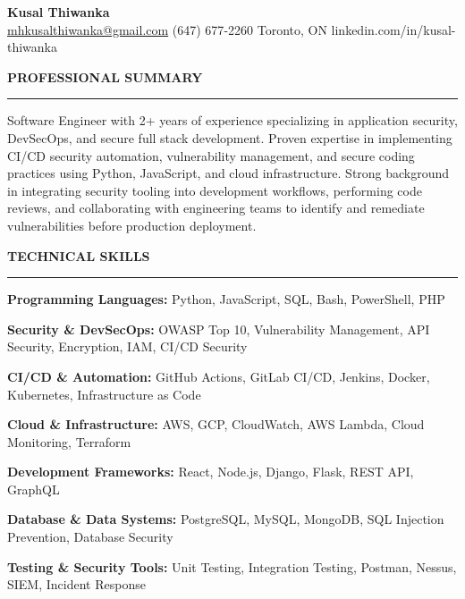 \documentclass[10pt,letterpaper]{article}
\begin{document}
\begin{center}
{\LARGE\textbf{Kusal Thiwanka}}\\[3pt]
\href{mailto:mhkusalthiwanka@gmail.com}{mhkusalthiwanka@gmail.com}\hspace{2em}%
(647) 677{-}2260\hspace{2em}%
Toronto, ON\hspace{2em}
linkedin.com/in/kusal-thiwanka
\end{center}

\vspace{6pt}

\textbf{PROFESSIONAL SUMMARY}\\[-8pt]
\noindent\rule{\textwidth}{1pt}

\vspace{-2pt}

Software Engineer with 2+ years of experience specializing in application security, DevSecOps, and secure full stack development. Proven expertise in implementing CI/CD security automation, vulnerability management, and secure coding practices using Python, JavaScript, and cloud infrastructure. Strong background in integrating security tooling into development workflows, performing code reviews, and collaborating with engineering teams to identify and remediate vulnerabilities before production deployment.

\vspace{8pt}

\textbf{TECHNICAL SKILLS}\\[-8pt]
\noindent\rule{\textwidth}{1pt}

\vspace{-2pt}

\textbf{Programming Languages:} Python, JavaScript, SQL, Bash, PowerShell, PHP

\textbf{Security \& DevSecOps:} OWASP Top 10, Vulnerability Management, API Security, Encryption, IAM, CI/CD Security

\textbf{CI/CD \& Automation:} GitHub Actions, GitLab CI/CD, Jenkins, Docker, Kubernetes, Infrastructure as Code

\textbf{Cloud \& Infrastructure:} AWS, GCP, CloudWatch, AWS Lambda, Cloud Monitoring, Terraform

\textbf{Development Frameworks:} React, Node.js, Django, Flask, REST API, GraphQL

\textbf{Database \& Data Systems:} PostgreSQL, MySQL, MongoDB, SQL Injection Prevention, Database Security

\textbf{Testing \& Security Tools:} Unit Testing, Integration Testing, Postman, Nessus, SIEM, Incident Response
\end{document}
